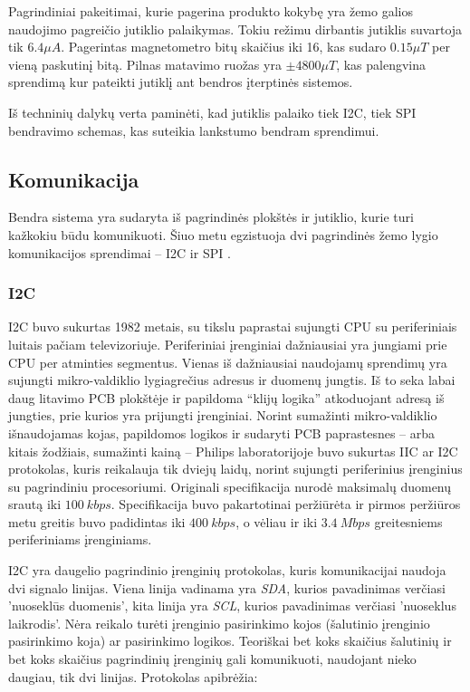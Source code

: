 Pagrindiniai pakeitimai, kurie pagerina produkto kokybę yra žemo galios naudojimo pagreičio jutiklio palaikymas.
Tokiu režimu dirbantis jutiklis suvartoja tik $6.4\mu A$.
Pagerintas magnetometro bitų skaičius iki 16, kas sudaro $0.15\mu T$ per vieną paskutinį bitą.
Pilnas matavimo ruožas yra $\pm4800\mu T$, kas palengvina sprendimą kur pateikti jutiklį ant bendros įterptinės sistemos.

Iš techninių dalykų verta paminėti, kad jutiklis palaiko tiek I2C, tiek SPI bendravimo schemas, kas suteikia lankstumo bendram sprendimui.

\subsection{Komunikacija}

Bendra sistema yra sudaryta iš pagrindinės plokštės ir jutiklio, kurie turi kažkokiu būdu komunikuoti. Šiuo metu egzistuoja dvi pagrindinės žemo lygio komunikacijos sprendimai -- I2C ir SPI \cite{Intro92:online}.

\subsubsection{I2C}

I2C buvo sukurtas 1982 metais, su tikslu paprastai sujungti CPU su periferiniais luitais pačiam televizoriuje.
Periferiniai įrenginiai dažniausiai yra jungiami prie CPU per atminties segmentus.
Vienas iš dažniausiai naudojamų sprendimų yra sujungti mikro-valdiklio lygiagrečius adresus ir duomenų jungtis.
Iš to seka labai daug litavimo PCB plokštėje ir papildoma ``klijų logika'' atkoduojant adresą iš jungties, prie kurios yra prijungti įrenginiai.
Norint sumažinti mikro-valdiklio išnaudojamas kojas, papildomos logikos ir sudaryti PCB paprastesnes -- arba kitais žodžiais, sumažinti kainą -- Philips laboratorijoje buvo sukurtas IIC ar I2C protokolas, kuris reikalauja tik dviejų laidų, norint sujungti periferinius įrenginius su pagrindiniu procesoriumi.
Originali specifikacija nurodė maksimalų duomenų srautą iki $100~kbps$.
Specifikacija buvo pakartotinai peržiūrėta ir pirmos peržiūros metu greitis buvo padidintas iki $400~kbps$, o vėliau ir iki $3.4~Mbps$ greitesniems periferiniams įrenginiams.

I2C yra daugelio pagrindinio įrenginių protokolas, kuris komunikacijai naudoja dvi signalo linijas.
Viena linija vadinama yra \textit{SDA}, kurios pavadinimas verčiasi 'nuoseklūs duomenis', kita linija yra \textit{SCL}, kurios pavadinimas verčiasi 'nuoseklus laikrodis'.
Nėra reikalo turėti įrenginio pasirinkimo kojos (šalutinio įrenginio pasirinkimo koja) ar pasirinkimo logikos.
Teoriškai bet koks skaičius šalutinių ir bet koks skaičius pagrindinių įrenginių gali komunikuoti, naudojant nieko daugiau, tik dvi linijas.
Protokolas apibrėžia:

